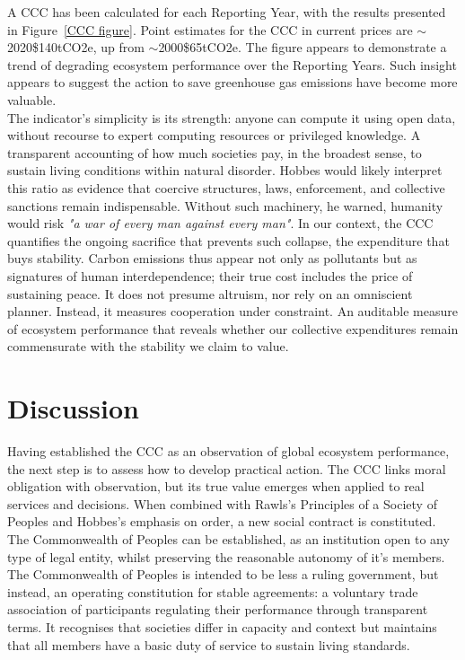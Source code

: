 A CCC has been calculated for each Reporting Year, with the results presented in Figure~\ref{CCC figure}.
Point estimates for the CCC in current prices are $\sim$2020\$140tCO2e, up from $\sim$2000\$65tCO2e.
The figure appears to demonstrate a trend of degrading ecosystem performance over the Reporting Years.
Such insight appears to suggest the action to save greenhouse gas emissions have become more valuable.\\

The indicator’s simplicity is its strength: anyone can compute it using open data, without recourse to expert computing resources or privileged knowledge.
A transparent accounting of how much societies pay, in the broadest sense, to sustain living conditions within natural disorder.
Hobbes would likely interpret this ratio as evidence that coercive structures, laws, enforcement, and collective sanctions remain indispensable.
Without such machinery, he warned, humanity would risk \emph{"a war of every man against every man"}.
In our context, the CCC quantifies the ongoing sacrifice that prevents such collapse, the expenditure that buys stability.
Carbon emissions thus appear not only as pollutants but as signatures of human interdependence; their true cost includes the price of sustaining peace.
It does not presume altruism, nor rely on an omniscient planner.
Instead, it measures cooperation under constraint.
An auditable measure of ecosystem performance that reveals whether our collective expenditures remain commensurate with the stability we claim to value.\\

\section{Discussion}

Having established the CCC as an observation of global ecosystem performance, the next step is to assess how to develop practical action.
The CCC links moral obligation with observation, but its true value emerges when applied to real services and decisions.
When combined with Rawls’s Principles of a Society of Peoples and Hobbes’s emphasis on order, a new social contract is constituted.
The Commonwealth of Peoples can be established, as an institution open to any type of legal entity, whilst preserving the reasonable autonomy of it's members.\\

The Commonwealth of Peoples is intended to be less a ruling government, but instead, an operating constitution for stable agreements: a voluntary trade association of participants regulating their performance through transparent terms.
It recognises that societies differ in capacity and context but maintains that all members have a basic duty of service to sustain living standards.\\

